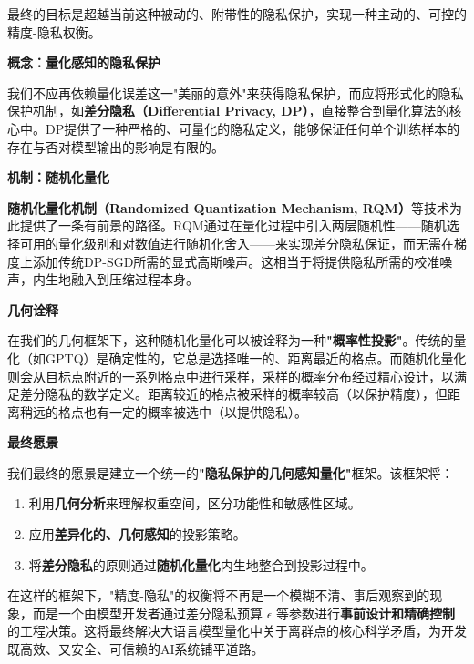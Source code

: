 \documentclass[letterpaper,twocolumn,10pt]{article}
\begin{document}
最终的目标是超越当前这种被动的、附带性的隐私保护，实现一种主动的、可控的精度-隐私权衡。

\textbf{概念：量化感知的隐私保护}

我们不应再依赖量化误差这一"美丽的意外"来获得隐私保护，而应将形式化的隐私保护机制，如\textbf{差分隐私（Differential Privacy, DP）}，直接整合到量化算法的核心中。DP提供了一种严格的、可量化的隐私定义，能够保证任何单个训练样本的存在与否对模型输出的影响是有限的。

\textbf{机制：随机化量化}

\textbf{随机化量化机制（Randomized Quantization Mechanism, RQM）}等技术为此提供了一条有前景的路径。RQM通过在量化过程中引入两层随机性——随机选择可用的量化级别和对数值进行随机化舍入——来实现差分隐私保证，而无需在梯度上添加传统DP-SGD所需的显式高斯噪声。这相当于将提供隐私所需的校准噪声，内生地融入到压缩过程本身。

\textbf{几何诠释}

在我们的几何框架下，这种随机化量化可以被诠释为一种\textbf{"概率性投影"}。传统的量化（如GPTQ）是确定性的，它总是选择唯一的、距离最近的格点。而随机化量化则会从目标点附近的一系列格点中进行采样，采样的概率分布经过精心设计，以满足差分隐私的数学定义。距离较近的格点被采样的概率较高（以保护精度），但距离稍远的格点也有一定的概率被选中（以提供隐私）。

\textbf{最终愿景}

我们最终的愿景是建立一个统一的\textbf{"隐私保护的几何感知量化"}框架。该框架将：

\begin{enumerate}
\item 利用\textbf{几何分析}来理解权重空间，区分功能性和敏感性区域。
\item 应用\textbf{差异化的、几何感知}的投影策略。
\item 将\textbf{差分隐私}的原则通过\textbf{随机化量化}内生地整合到投影过程中。
\end{enumerate}

在这样的框架下，"精度-隐私"的权衡将不再是一个模糊不清、事后观察到的现象，而是一个由模型开发者通过差分隐私预算 $\epsilon$ 等参数进行\textbf{事前设计和精确控制}的工程决策。这将最终解决大语言模型量化中关于离群点的核心科学矛盾，为开发既高效、又安全、可信赖的AI系统铺平道路。

% 
% 
\end{document}
